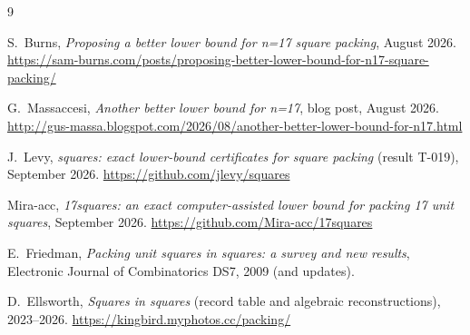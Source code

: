 \documentclass[11pt]{article}
\theoremstyle{definition}
\theoremstyle{remark}
\begin{document}
\begin{thebibliography}{9}
\small\raggedright

S.~Burns,
\emph{Proposing a better lower bound for n=17 square packing},
August 2026.
\url{https://sam-burns.com/posts/proposing-better-lower-bound-for-n17-square-packing/}

G.~Massaccesi,
\emph{Another better lower bound for n=17}, blog post, August 2026.
\url{http://gus-massa.blogspot.com/2026/08/another-better-lower-bound-for-n17.html}

J.~Levy,
\emph{squares: exact lower-bound certificates for square packing}
(result T-019), September 2026.
\url{https://github.com/jlevy/squares}

Mira-acc,
\emph{17squares: an exact computer-assisted lower bound for packing 17
unit squares}, September 2026.
\url{https://github.com/Mira-acc/17squares}

E.~Friedman,
\emph{Packing unit squares in squares: a survey and new results},
Electronic Journal of Combinatorics DS7, 2009 (and updates).

D.~Ellsworth,
\emph{Squares in squares} (record table and algebraic reconstructions),
2023--2026.
\url{https://kingbird.myphotos.cc/packing/}

\end{thebibliography}
\end{document}
